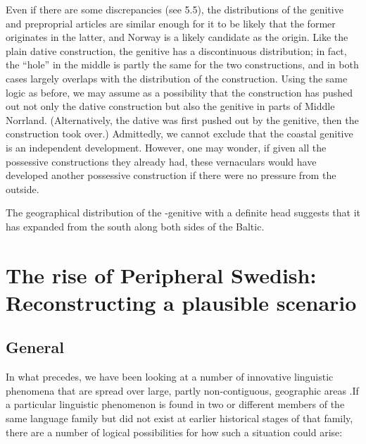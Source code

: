 Even if there are some discrepancies (see 5.5), the distributions of the genitive and preproprial articles are similar enough for it to be likely that the former originates in the latter, and Norway is a likely candidate as the origin. Like the plain dative construction, the genitive has a discontinuous distribution; in fact, the “hole” in the middle is partly the same for the two constructions, and in both cases largely overlaps with the distribution of the  construction. Using the same logic as before, we may assume as a possibility that the  construction has pushed out not only the dative construction but also the genitive in parts of Middle Norrland. (Alternatively, the dative was first pushed out by the genitive, then the construction took over.) Admittedly, we cannot exclude that the coastal genitive is an independent development. However, one may wonder, if given all the possessive constructions they already had, these vernaculars would have developed another possessive construction if there were no pressure from the outside.

The geographical distribution of the -genitive with a definite head suggests that it has expanded from the south along both sides of the Baltic. 

\section[The rise of Peripheral Swedish: Reconstructing a plausible scenario]{\rmfamily The rise of Peripheral Swedish: Reconstructing a plausible scenario}
\subsection[General]{\rmfamily General}
\label{bkm:Ref154567423}%
In what precedes, we have been looking at a number of innovative linguistic phenomena that are spread over large, partly non-contiguous, geographic areas .If a particular linguistic phenomenon is found in two or different members of the same language family but did not exist at earlier historical stages of that family, there are a number of logical possibilities for how such a situation could arise:  

